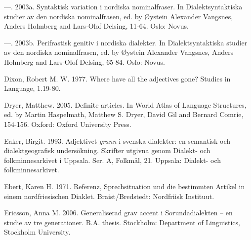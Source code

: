 \begin{styleBodytextC}
—. 2003a. Syntaktisk variation i nordiska nominalfraser. In Dialektsyntaktiska studier av den nordiska nominalfrasen, ed. by Øystein Alexander Vangsnes, Anders Holmberg and Lars-Olof Delsing, 11-64. Oslo: Novus.

\end{styleBodytextC}

\begin{styleBodytextC}
—. 2003b. Perifrastisk genitiv i nordiska dialekter. In Dialektsyntaktiska studier av den nordiska nominalfrasen, ed. by Øystein Alexander Vangsnes, Anders Holmberg and Lars-Olof Delsing, 65-84. Oslo: Novus.

\end{styleBodytextC}

\begin{styleBodytextC}
Dixon, Robert M. W. 1977. Where have all the adjectives gone? Studies in Language, 1.19-80.

\end{styleBodytextC}

\begin{styleBodytextC}
Dryer, Matthew. 2005. Definite articles. In World Atlas of Language Structures, ed. by Martin Haspelmath, Matthew S. Dryer, David Gil and Bernard Comrie, 154-156. Oxford: Oxford University Press.

\end{styleBodytextC}

\begin{styleBodytextC}
Eaker, Birgit. 1993. Adjektivet \textit{grann} i svenska dialekter: en semantisk och dialektgeografisk undersökning. Skrifter utgivna genom Dialekt- och folkminnesarkivet i Uppsala. Ser. A, Folkmål, 21. Uppsala: Dialekt- och folkminnesarkivet.

\end{styleBodytextC}

\begin{styleBodytextC}
Ebert, Karen H. 1971. Referenz, Sprechsituation und die bestimmten Artikel in einem nordfriesischen Diaklet. Braist/Bredstedt: Nordfriisk Instituut.

\end{styleBodytextC}

\begin{styleBodytextC}
Ericsson, Anna M. 2006. Generaliserad grav accent i Sorundadialekten – en studie av tre generationer. B.A. thesis. Stockholm: Department of Linguistics, Stockholm University.

\end{styleBodytextC}

